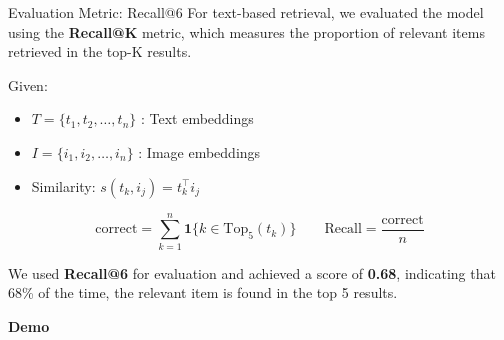   \begin{frame}{Evaluation Metric: Recall@6}
    \small
    For text-based retrieval, we evaluated the model using the \textbf{Recall@K} metric, which measures the proportion of relevant items retrieved in the top-K results.

    \vspace{0.5em}

    Given:
    \begin{itemize}
        \setlength\itemsep{-0.25em}
        \item \( T = \{ t_1, t_2, \ldots, t_n \} \) : Text embeddings
        \item \( I = \{ i_1, i_2, \ldots, i_n \} \) : Image embeddings
        \item Similarity: \( s(t_k, i_j) = t_k^\top i_j \)
    \end{itemize}
    \normalsize
    \[
    \text{correct} = \sum_{k=1}^{n} \mathbf{1}\{k \in \text{Top}_5(t_k)\}
    \quad \quad
    \text{Recall} = \frac{\text{correct}}{n}
    \]
    \small
    \vspace{0.5em}

    We used \textbf{Recall@6} for evaluation and achieved a score of \textbf{0.68}, indicating that 68\% of the time, the relevant item is found in the top 5 results.
    \end{frame}

\begin{frame}{}
  \Huge
  \centering
  \textbf{Demo}
  \normalsize
\end{frame}
